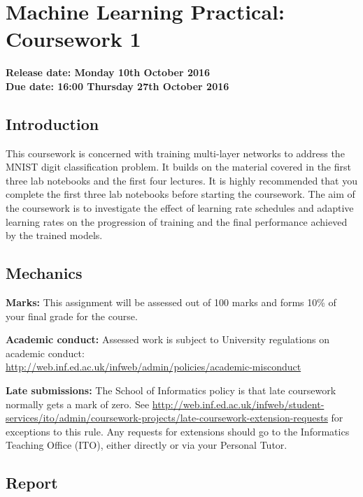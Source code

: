 \documentclass[11pt,]{article}
\author{}
\date{}
\begin{document}
\section{Machine Learning Practical: Coursework
1}\label{machine-learning-practical-coursework-1}

\textbf{Release date: Monday 10th October 2016}\\\textbf{Due date: 16:00
Thursday 27th October 2016}

\subsection{Introduction}\label{introduction}

This coursework is concerned with training multi-layer networks to
address the MNIST digit classification problem. It builds on the
material covered in the first three lab notebooks and the first four
lectures. It is highly recommended that you complete the first three lab
notebooks before starting the coursework. The aim of the coursework is
to investigate the effect of learning rate schedules and adaptive
learning rates on the progression of training and the final performance
achieved by the trained models.

\subsection{Mechanics}\label{mechanics}

\textbf{Marks:} This assignment will be assessed out of 100 marks and
forms 10\% of your final grade for the course.

\textbf{Academic conduct:} Assessed work is subject to University
regulations on academic
conduct:\\\url{http://web.inf.ed.ac.uk/infweb/admin/policies/academic-misconduct}

\textbf{Late submissions:} The School of Informatics policy is that late
coursework normally gets a mark of zero. See
{\small\url{http://web.inf.ed.ac.uk/infweb/student-services/ito/admin/coursework-projects/late-coursework-extension-requests}}
for exceptions to this rule. Any requests for extensions should go to
the Informatics Teaching Office (ITO), either directly or via your
Personal Tutor.

\subsection{Report}\label{report}
\end{document}
